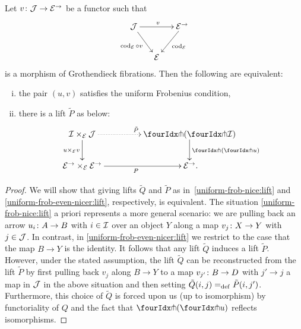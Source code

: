 \documentclass[reqno,10pt,a4paper,oneside,draft]{amsart}
\begin{document}
{{\begin{proposition}
\label{uniform-frob-even-nicer}
Let $v \co \cal{J} \to \cal{E}^\to$ be a functor such that
\begin{equation} \label{uniform-frob:comprehension}
\begin{gathered}
\xymatrix@C-1em{
  \cal{J}
  \ar[rr]^{v}
  \ar[dr]_{\cod_{\cal{E}} \cc v}
&&
  \cal{E}^\to
  \ar[dl]^{\cod_{\cal{E}}}
\\&
  \cal{E}
}
\end{gathered}
\end{equation}
is a morphism of Grothendieck fibrations. Then the following are equivalent:
\begin{enumerate}[(i)] 
\item the pair $(u, v)$ satisfies the  uniform Frobenius condition,
\item there is a lift $\tilde{P}$ as below:
\begin{equation} \label{uniform-frob-even-nicer:lift}
\begin{gathered}
\xymatrix@C+2em{
  \cal{I} \times_{\cal{E}} \cal{J}
  \ar@{.>}[r]^{\tilde{P}}
  \ar[d]_{u \times_{\cal{E}} v}
&
  \liftl{(\liftr{\cal{I}})}
  \ar[d]^{\liftl{(\liftr{u})}}
\\
  \cal{E}^\to \times_{\cal{E}} \cal{E}^\to
  \ar[r]_{P}
&
  \cal{E}^\to
\rlap{.}}
\end{gathered}
\end{equation}
\end{enumerate}
\end{proposition}

\begin{proof}
We will show that giving lifts $\tilde{Q}$ and $\tilde{P}$ as in~\eqref{uniform-frob-nice:lift} and \eqref{uniform-frob-even-nicer:lift}, respectively,
is equivalent.
The situation \eqref{uniform-frob-nice:lift} a priori represents a more general scenario: we are pulling back an arrow $u_i \co A \to B$ with $i \in \cal{I}$ over an object $Y$ along a map $v_j \co X \to Y$ with $j \in \cal{J}$.
In contrast, in \eqref{uniform-frob-even-nicer:lift} we restrict to the case that the map $B \to Y$ is the identity.
It follows that any lift $\tilde{Q}$ induces a lift $\tilde{P}$.
However, under the stated assumption, the lift $\tilde{Q}$ can be reconstructed from the lift $\tilde{P}$ by first pulling back $v_j$ along $B \to Y$ to a map $v_{j'} \co B \to D$ with $j' \to j$ a map in $\cal{J}$ in the above situation and then setting $\tilde{Q}(i, j) \defeq \tilde{P}(i, j')$.
Furthermore, this choice of $\tilde{Q}$ is forced upon us (up to isomorphism) by functoriality of $Q$ and the fact that $\liftl{(\liftr{u})}$ reflects isomorphisms.
\end{proof}

}}
\end{document}
